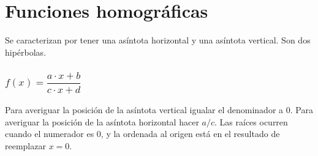 \section{Funciones homográficas}

Se caracterizan por tener una asíntota horizontal y una asíntota vertical. Son dos hipérbolas.

\subsubsection*{
$f(x)= \dfrac{a\cdot x + b}{c \cdot x + d}$}


Para averiguar la posición de la asíntota vertical igualar el denominador a 0. Para averiguar la posición de la asíntota horizontal hacer $a/c$. Las raíces ocurren cuando el numerador es 0, y la ordenada al origen está en el resultado de reemplazar $x=0$.